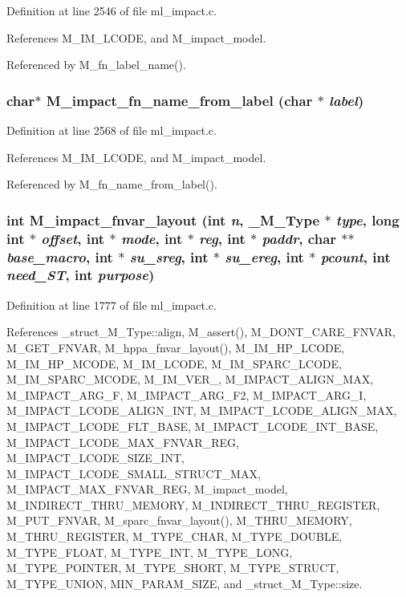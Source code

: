 Definition at line 2546 of file ml\_\-impact.c.

References M\_\-IM\_\-LCODE, and M\_\-impact\_\-model.

Referenced by M\_\-fn\_\-label\_\-name().
\subsubsection{\setlength{\rightskip}{0pt plus 5cm}char$\ast$ M\_\-impact\_\-fn\_\-name\_\-from\_\-label (char $\ast$ {\em label})}\label{ml__impact_8c_5979949472a3ff0de008104e3a0a5659}




Definition at line 2568 of file ml\_\-impact.c.

References M\_\-IM\_\-LCODE, and M\_\-impact\_\-model.

Referenced by M\_\-fn\_\-name\_\-from\_\-label().
\subsubsection{\setlength{\rightskip}{0pt plus 5cm}int M\_\-impact\_\-fnvar\_\-layout (int {\em n}, \bf{\_\-M\_\-Type} $\ast$ {\em type}, long int $\ast$ {\em offset}, int $\ast$ {\em mode}, int $\ast$ {\em reg}, int $\ast$ {\em paddr}, char $\ast$$\ast$ {\em base\_\-macro}, int $\ast$ {\em su\_\-sreg}, int $\ast$ {\em su\_\-ereg}, int $\ast$ {\em pcount}, int {\em need\_\-ST}, int {\em purpose})}\label{ml__impact_8c_207bcdded4eed80210d0b158c71deef0}




Definition at line 1777 of file ml\_\-impact.c.

References \_\-struct\_\-M\_\-Type::align, M\_\-assert(), M\_\-DONT\_\-CARE\_\-FNVAR, M\_\-GET\_\-FNVAR, M\_\-hppa\_\-fnvar\_\-layout(), M\_\-IM\_\-HP\_\-LCODE, M\_\-IM\_\-HP\_\-MCODE, M\_\-IM\_\-LCODE, M\_\-IM\_\-SPARC\_\-LCODE, M\_\-IM\_\-SPARC\_\-MCODE, M\_\-IM\_\-VER\_, M\_\-IMPACT\_\-ALIGN\_\-MAX, M\_\-IMPACT\_\-ARG\_\-F, M\_\-IMPACT\_\-ARG\_\-F2, M\_\-IMPACT\_\-ARG\_\-I, M\_\-IMPACT\_\-LCODE\_\-ALIGN\_\-INT, M\_\-IMPACT\_\-LCODE\_\-ALIGN\_\-MAX, M\_\-IMPACT\_\-LCODE\_\-FLT\_\-BASE, M\_\-IMPACT\_\-LCODE\_\-INT\_\-BASE, M\_\-IMPACT\_\-LCODE\_\-MAX\_\-FNVAR\_\-REG, M\_\-IMPACT\_\-LCODE\_\-SIZE\_\-INT, M\_\-IMPACT\_\-LCODE\_\-SMALL\_\-STRUCT\_\-MAX, M\_\-IMPACT\_\-MAX\_\-FNVAR\_\-REG, M\_\-impact\_\-model, M\_\-INDIRECT\_\-THRU\_\-MEMORY, M\_\-INDIRECT\_\-THRU\_\-REGISTER, M\_\-PUT\_\-FNVAR, M\_\-sparc\_\-fnvar\_\-layout(), M\_\-THRU\_\-MEMORY, M\_\-THRU\_\-REGISTER, M\_\-TYPE\_\-CHAR, M\_\-TYPE\_\-DOUBLE, M\_\-TYPE\_\-FLOAT, M\_\-TYPE\_\-INT, M\_\-TYPE\_\-LONG, M\_\-TYPE\_\-POINTER, M\_\-TYPE\_\-SHORT, M\_\-TYPE\_\-STRUCT, M\_\-TYPE\_\-UNION, MIN\_\-PARAM\_\-SIZE, and \_\-struct\_\-M\_\-Type::size.

